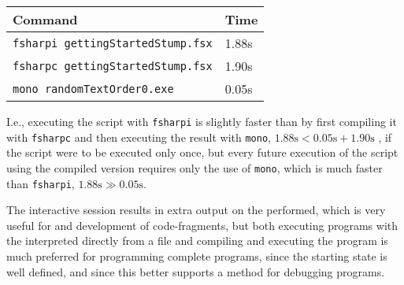 \begin{center}
  \begin{tabular}{|l|l|}
    \hline
    Command & Time\\
    \hline
    \verb|fsharpi gettingStartedStump.fsx| & 1.88s\\
    \verb|fsharpc gettingStartedStump.fsx| & 1.90s\\
    \verb|mono randomTextOrder0.exe| & 0.05s\\
    \hline
\end{tabular}
\end{center}
I.e., executing the script with \verb|fsharpi| is slightly faster than by first compiling it with \verb|fsharpc| and then executing the result with \verb|mono|, $1.88\text{s} < 0.05\text{s}+1.90\text{s}$ , if the script were to be executed only once, but every future execution of the script using the compiled version requires only the use of \verb|mono|, which is much faster than \verb|fsharpi|, $1.88\text{s}\gg 0.05\text{s}$.

The interactive session results in extra output on the  performed, which is very useful for  and development of code-fragments, but both executing programs with the interpreted directly from a file and compiling and executing the program is much preferred for programming complete programs, since the starting state is well defined, and since this better supports  a method for debugging programs.

\begin{comment}
  \section{Behind the scene}
  \jon{I'm not sure, whether it will be a good idea to describe this. Could be used as the umbrella for the specifikation of the program.} When a program is compiled or interpreted the following steps are performed by the system
  \begin{enumerate}
  \item Decoding
  \item Tokenization
  \item Lexical Filtering
  \item Parsing
  \item Importing
  \item Checking
  \item Elaboration
  \item Execution
  \end{enumerate}
\end{comment}

